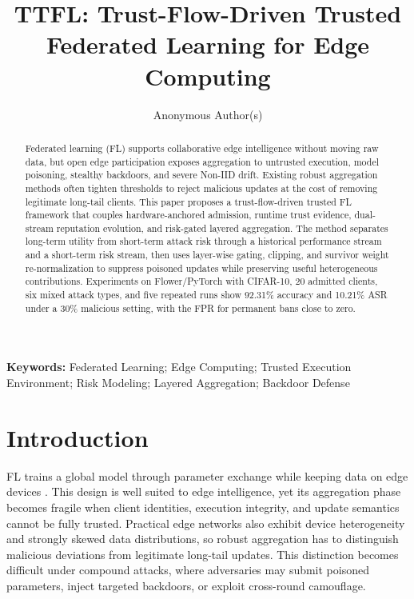 \documentclass[runningheads,orivec]{llncs}
\begin{document}
\title{TTFL: Trust-Flow-Driven Trusted Federated Learning for Edge Computing}

\author{Anonymous Author(s)}
\institute{}

\maketitle

\begin{abstract}
    Federated learning (FL) supports collaborative edge intelligence without moving raw data, but open edge participation exposes aggregation to untrusted execution, model poisoning, stealthy backdoors, and severe Non-IID drift. Existing robust aggregation methods often tighten thresholds to reject malicious updates at the cost of removing legitimate long-tail clients. This paper proposes a trust-flow-driven trusted FL framework that couples hardware-anchored admission, runtime trust evidence, dual-stream reputation evolution, and risk-gated layered aggregation. The method separates long-term utility from short-term attack risk through a historical performance stream and a short-term risk stream, then uses layer-wise gating, clipping, and survivor weight re-normalization to suppress poisoned updates while preserving useful heterogeneous contributions. Experiments on Flower/PyTorch with CIFAR-10, 20 admitted clients, six mixed attack types, and five repeated runs show 92.31\% accuracy and 10.21\% ASR under a 30\% malicious setting, with the FPR for permanent bans close to zero.
\end{abstract}

\noindent\textbf{Keywords:} Federated Learning; Edge Computing; Trusted Execution Environment; Risk Modeling; Layered Aggregation; Backdoor Defense

\section{Introduction}

FL trains a global model through parameter exchange while keeping data on edge devices \cite{kairouz2021flsurvey,mcmahan2017fedavg}. This design is well suited to edge intelligence, yet its aggregation phase becomes fragile when client identities, execution integrity, and update semantics cannot be fully trusted. Practical edge networks also exhibit device heterogeneity and strongly skewed data distributions, so robust aggregation has to distinguish malicious deviations from legitimate long-tail updates. This distinction becomes difficult under compound attacks, where adversaries may submit poisoned parameters, inject targeted backdoors, or exploit cross-round camouflage.
\end{document}
